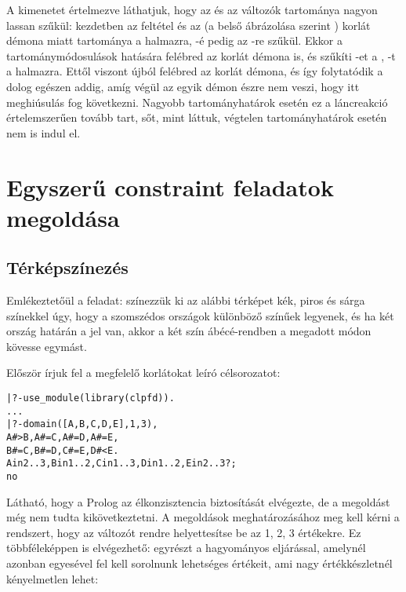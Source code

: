 A kimenetet értelmezve láthatjuk, hogy az  és az  változók
tartománya nagyon lassan szűkül: kezdetben az  feltétel
és az  (a \clpfd belső ábrázolása szerint )
korlát démona miatt  tartománya a  halmazra, -é pedig
az -re szűkül. Ekkor a tartománymódosulások hatására felébred
az  korlát démona is, és szűkíti -et a , -t
a  halmazra. Ettől viszont újból felébred az  korlát
démona, és így folytatódik a dolog egészen addig, amíg végül az egyik
démon észre nem veszi, hogy itt meghiúsulás fog következni. Nagyobb
tartományhatárok esetén ez a láncreakció értelemszerűen tovább tart, sőt,
mint láttuk, végtelen tartományhatárok esetén nem is indul el.

\section{Egyszerű constraint feladatok megoldása}

\subsection{Térképszínezés}

Emlékeztetőül a feladat: színezzük ki az alábbi térképet kék, piros és
sárga színekkel úgy, hogy a szomszédos országok különböző színűek legyenek,
és ha két ország határán a \cd{<} jel van, akkor a két szín ábécé-rendben
a megadott módon kövesse egymást.

\begin{center}\end{center}

Először írjuk fel a megfelelő korlátokat leíró \clpfd célsorozatot:

\begin{alltt}
| ?- use_module(library(clpfd)).
...
| ?- domain([A,B,C,D,E], 1, 3),
     A #> B, A #\bs= C, A #\bs= D, A #\bs= E,
     B #\bs= C, B #\bs= D, C #\bs= E, D #< E.
A in 2..3, B in 1..2, C in 1..3, D in 1..2, E in 2..3 ? ;
no
\end{alltt}

Látható, hogy a Prolog az élkonzisztencia biztosítását elvégezte, de a
megoldást még nem tudta kikövetkeztetni. A megoldások meghatározásához
meg kell kérni a rendszert, hogy az  változót rendre helyettesítse
be az 1, 2, 3 értékekre. Ez többféleképpen is elvégezhető: egyrészt a
hagyományos  eljárással, amelynél azonban egyesével fel kell
sorolnunk  lehetséges értékeit, ami nagy értékkészletnél kényelmetlen
lehet:

